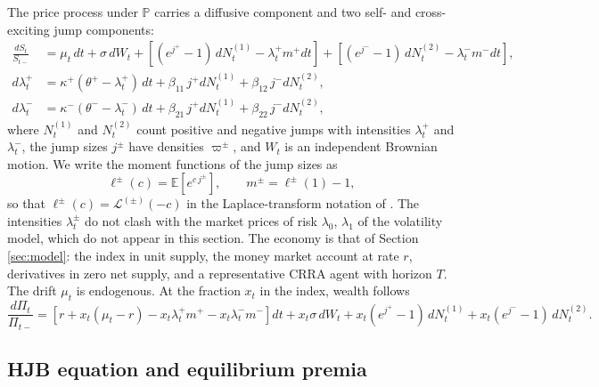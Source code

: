 \documentclass[11pt]{article}
\theoremstyle{remark}
\newcommand{\E}{\mathbb{E}}
\newcommand{\PP}{\mathbb{P}}
\begin{document}
The price process under $\PP$ carries a diffusive component and two self- and cross-exciting jump components:
\begin{equation}\label{eq:hawkes_dS}
\begin{split}
\frac{dS_{t}}{S_{t-}} &= \mu_{t}\, dt + \sigma\, dW_{t} + \left[ (e^{j^{+}}-1)\, dN^{(1)}_{t} - \lambda^{+}_{t} m^{+} dt \right] + \left[ (e^{j^{-}}-1)\, dN^{(2)}_{t} - \lambda^{-}_{t} m^{-} dt \right],\\
d\lambda^{+}_{t} &= \kappa^{+}(\theta^{+}-\lambda^{+}_{t})\, dt + \beta_{11}\, j^{+} dN^{(1)}_{t} + \beta_{12}\, j^{-} dN^{(2)}_{t},\\
d\lambda^{-}_{t} &= \kappa^{-}(\theta^{-}-\lambda^{-}_{t})\, dt + \beta_{21}\, j^{+} dN^{(1)}_{t} + \beta_{22}\, j^{-} dN^{(2)}_{t},
\end{split}
\end{equation}
where $N^{(1)}_{t}$ and $N^{(2)}_{t}$ count positive and negative jumps with intensities $\lambda^{+}_{t}$ and $\lambda^{-}_{t}$, the jump sizes $j^{\pm}$ have densities $\varpi^{\pm}$, and $W_{t}$ is an independent Brownian motion. We write the moment functions of the jump sizes as
\begin{equation}\label{eq:hawkes_ell}
\ell^{\pm}(c) = \E\left[ e^{c\, j^{\pm}} \right], \qquad m^{\pm} = \ell^{\pm}(1) - 1,
\end{equation}
so that $\ell^{\pm}(c) = \mathcal{L}^{(\pm)}(-c)$ in the Laplace-transform notation of \cite{LiuPackhamSepp2026}. The intensities $\lambda^{\pm}_{t}$ do not clash with the market prices of risk $\lambda_{0}$, $\lambda_{1}$ of the volatility model, which do not appear in this section. The economy is that of Section \ref{sec:model}: the index in unit supply, the money market account at rate $r$, derivatives in zero net supply, and a representative CRRA agent with horizon $T$. The drift $\mu_{t}$ is endogenous. At the fraction $x_{t}$ in the index, wealth follows
\begin{equation}\label{eq:hawkes_wealth}
\frac{d\Pi_{t}}{\Pi_{t-}} = \left[ r + x_{t}(\mu_{t}-r) - x_{t}\lambda^{+}_{t}m^{+} - x_{t}\lambda^{-}_{t}m^{-} \right] dt + x_{t}\sigma\, dW_{t} + x_{t}(e^{j^{+}}-1)\, dN^{(1)}_{t} + x_{t}(e^{j^{-}}-1)\, dN^{(2)}_{t}.
\end{equation}

\subsection{HJB equation and equilibrium premia}
\end{document}
